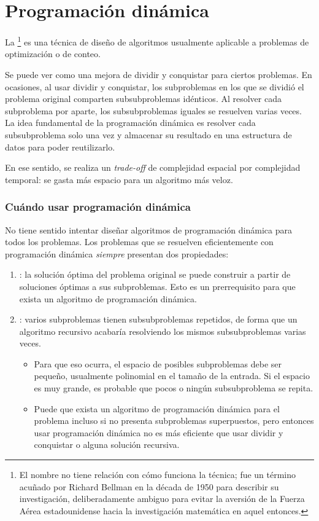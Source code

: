 \section{Programación dinámica}

La \footnote{El nombre no tiene relación con cómo funciona la técnica; fue un término acuñado por Richard Bellman en la década de 1950 para describir su investigación, deliberadamente ambiguo para evitar la aversión de la Fuerza Aérea estadounidense hacia la investigación matemática en aquel entonces.} es una técnica de diseño de algoritmos usualmente aplicable a problemas de optimización o de conteo.

Se puede ver como una mejora de dividir y conquistar para ciertos problemas. En ocasiones, al usar dividir y conquistar, los subproblemas en los que se dividió el problema original comparten subsubproblemas idénticos. Al resolver cada subproblema por aparte, los subsubproblemas iguales se resuelven varias veces. La idea fundamental de la programación dinámica es resolver cada subsubproblema solo una vez y almacenar su resultado en una estructura de datos para poder reutilizarlo. 

En ese sentido, se realiza un \textit{trade-off} de complejidad espacial por complejidad temporal: se gasta más espacio para un algoritmo más veloz.

\subsubsection{Cuándo usar programación dinámica}

No tiene sentido intentar diseñar algoritmos de programación dinámica para todos los problemas. Los problemas que se resuelven eficientemente con programación dinámica \textit{siempre} presentan dos propiedades:
\begin{enumerate}
    \item {}: la solución óptima del problema original se puede construir a partir de soluciones óptimas a sus subproblemas. Esto es un prerrequisito para que exista un algoritmo de programación dinámica.
    \item {}: varios subproblemas tienen subsubproblemas repetidos, de forma que un algoritmo recursivo acabaría resolviendo los mismos subsubproblemas varias veces.
    \begin{itemize}
        \item Para que eso ocurra, el espacio de posibles subproblemas debe ser pequeño, usualmente polinomial en el tamaño de la entrada. Si el espacio es muy grande, es probable que pocos o ningún subsubproblema se repita.
        \item Puede que exista un algoritmo de programación dinámica para el problema incluso si no presenta subproblemas superpuestos, pero entonces usar programación dinámica no es más eficiente que usar dividir y conquistar o alguna solución recursiva.
    \end{itemize}
\end{enumerate}

